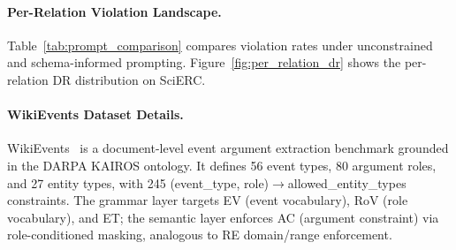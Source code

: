 
\paragraph{Per-Relation Violation Landscape.}
\label{app:per-relation-landscape}

Table~\ref{tab:prompt_comparison} compares violation rates under unconstrained and schema-informed prompting.
Figure~\ref{fig:per_relation_dr} shows the per-relation DR distribution on SciERC.

\begin{table}[t]
\centering
\small
\caption{Violation rates (\%) under unconstrained and schema-informed prompting (Qwen3-8B, zero-shot).}
\label{tab:prompt_comparison}
\end{table}


\paragraph{WikiEvents Dataset Details.}
\label{app:wikievents}
WikiEvents~\cite{li2021document} is a document-level event argument extraction benchmark grounded in the DARPA KAIROS ontology.
It defines 56 event types, 80 argument roles, and 27 entity types, with 245 (event\_type, role)$\to$allowed\_entity\_types constraints.
The grammar layer targets EV (event vocabulary), RoV (role vocabulary), and ET; the semantic layer enforces AC (argument constraint) via role-conditioned masking, analogous to RE domain/range enforcement.

